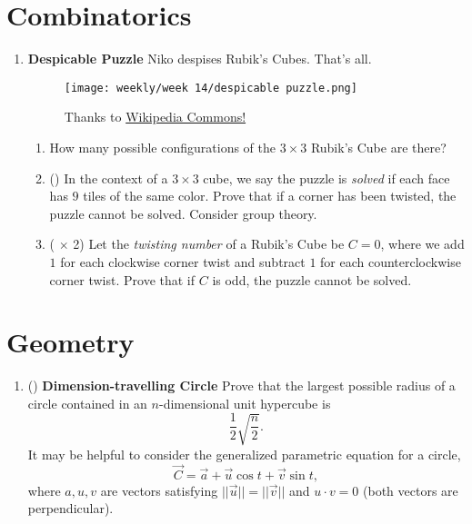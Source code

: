 \documentclass[11pt]{scrartcl}
\begin{document}
\section{Combinatorics}
\begin{enumerate}[label=\textbf{C\arabic*}.]
    \item \textbf{Despicable Puzzle} \newline
    Niko despises Rubik's Cubes. That's all.
    \begin{figure}[h]
        \centering
        \texttt{[image: weekly/week 14/despicable puzzle.png]}
        \hspace{2em}
        \caption{Thanks to \href{https://commons.wikimedia.org/wiki/File:Rubik\%27s_cube.svg}{Wikipedia Commons!}}
        \label{fig:despicable}
    \end{figure}
    
    \begin{enumerate}
        \item How many possible configurations of the $3 \times 3$ Rubik's Cube are there?
        
        \item (\fullchili) In the context of a $3 \times 3$ cube, we say the puzzle is \textit{solved} if each face has $9$ tiles of the same color. Prove that if a corner has been twisted, the puzzle cannot be solved. Consider group theory.
        
        \item (\fullchili \hspace{1pt} $\times$ 2) Let the \textit{twisting number} of a Rubik's Cube be $C = 0$, where we add $1$ for each clockwise corner twist and subtract $1$ for each counterclockwise corner twist. Prove that if $C$ is odd, the puzzle cannot be solved.
    \end{enumerate}
    
\end{enumerate}

\newpage
\section{Geometry}
\begin{enumerate}[label=\textbf{G\arabic*}.]
    \item (\fullchili) \textbf{Dimension-travelling Circle} \newline
    Prove that the largest possible radius of a circle contained in an $n$-dimensional unit hypercube is
    \[ \frac{1}{2}\sqrt{\frac{n}{2}}. \]
    It may be helpful to consider the generalized parametric equation for a circle,
    \[ \overrightarrow{C} = \overrightarrow{a} + \overrightarrow{u}\cos t + \overrightarrow{v}\sin t, \]
    where $a, u, v$ are vectors satisfying $\lvert\lvert \overrightarrow{u} \rvert\rvert = \lvert\lvert \overrightarrow{v} \rvert\rvert$ and $u \cdot v = 0$ (both vectors are perpendicular).
\end{enumerate}
\end{document}
